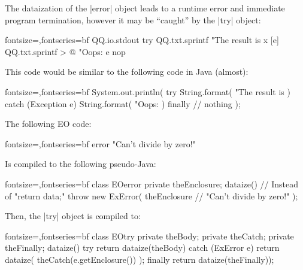 \documentclass{article}
\begin{document}
\plush{}
\begin{pptWide}{2}
The dataization of the |error| object leads to a runtime error and immediate program termination, however it may be ``caught'' by the |try| object:
\begin{ffcode*}{fontsize=\scriptsize,fontseries=bf}
QQ.io.stdout
  try
    QQ.txt.sprintf
      "The result is %
      x
    [e]
      QQ.txt.sprintf > @
        "Oops: %
        e
    nop
\end{ffcode*}
\columnbreak
This code would be similar to the following code in Java (almost):
\begin{ffcode*}{fontsize=\scriptsize,fontseries=bf}
System.out.println(
  try {
    String.format(
      "The result is %
    )
  } catch (Exception e) {
    String.format(
      "Oops: %
    )
  } finally {
    // nothing
  }
);
\end{ffcode*}
\end{pptWide}

\plush{}
\begin{pptWide}{2}
The following EO code:
\begin{ffcode*}{fontsize=\scriptsize,fontseries=bf}
error "Can't divide by zero!"
\end{ffcode*}
Is compiled to the following pseudo-Java:
\begin{ffcode*}{fontsize=\scriptsize,fontseries=bf}
class EOerror {
  private theEnclosure;
  dataize() {
    // Instead of "return data;"
    throw new ExError(
      theEnclosure
      // "Can't divide by zero!"
    );
  }
}
\end{ffcode*}
\columnbreak
Then, the |try| object is compiled to:
\begin{ffcode*}{fontsize=\scriptsize,fontseries=bf}
class EOtry {
  private theBody;
  private theCatch;
  private theFinally;
  dataize() {
    try {
      return dataize(theBody)
    } catch (ExError e) {
      return dataize(
        theCatch(e.getEnclosure())
      );
    } finally {
      return dataize(theFinally));
    }
  }
}
\end{ffcode*}
\end{pptWide}

\plush{}

\end{document}
